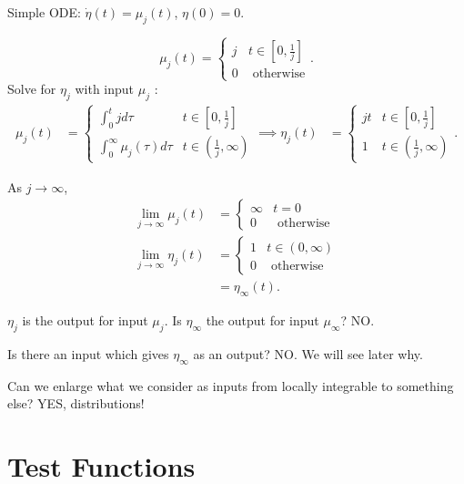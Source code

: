 \begin{example}
	Simple ODE: $\dot{\eta} \left( t \right)  = \mu_{j}\left( t \right) $, $\eta\left( 0 \right)  = 0$.

	\[
		\mu_{j}\left( t \right) = \begin{cases}
			j & t \in  \left[ 0, \frac{1}{j} \right] \\
			0 & \text{ otherwise}
		\end{cases}
	.\] Solve for $\eta_{j}$ with input $\mu_{j}$ :
	\begin{align*}
		\mu_{j}\left( t \right) &= \begin{cases}
			\int_{0}^{t} jd\tau & t \in \left[ 0, \frac{1}{j} \right]  \\
			\int_{0}^{\infty} \mu_{j}\left( \tau \right) d\tau & t \in \left( \frac{1}{j}, \infty \right) 
		\end{cases}
		\implies \eta_{j}\left( t \right) &= \begin{cases}
			jt & t \in  \left[ 0,\frac{1}{j} \right]  \\
			1 & t \in \left( \frac{1}{j}, \infty \right) 
		\end{cases}
	.\end{align*}

	As $j \to  \infty$,
	\begin{align*}
		\lim_{j \to \infty} \mu_{j}\left( t \right) &= \begin{cases}
			\infty & t = 0\\
			0 & \text{ otherwise}
		\end{cases} \\
		\lim_{j \to \infty} \eta_{j} \left( t \right) &= \begin{cases}
			1 & t \in  \left( 0, \infty \right) \\
			0 & \text{ otherwise}
		\end{cases} \\
			&= \eta_{\infty}\left( t \right) 
	.\end{align*}
\end{example}
 
$\eta_{j}$ is the output for input $\mu_{j}$. Is $\eta_{\infty}$ the output for input $\mu_{\infty}$? NO.

Is there an input which gives $\eta_{\infty}$ as an output? NO. We will see later why. 

Can we enlarge what we consider as inputs from locally integrable to something else? YES, distributions!

\section{Test Functions}

